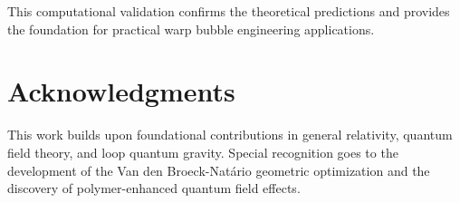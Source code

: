 \documentclass[11pt,a4paper]{article}
\begin{document}
This computational validation confirms the theoretical predictions and provides the foundation for practical warp bubble engineering applications.

\section*{Acknowledgments}

This work builds upon foundational contributions in general relativity, quantum field theory, and loop quantum gravity. Special recognition goes to the development of the Van den Broeck-Natário geometric optimization and the discovery of polymer-enhanced quantum field effects.



\end{document}
